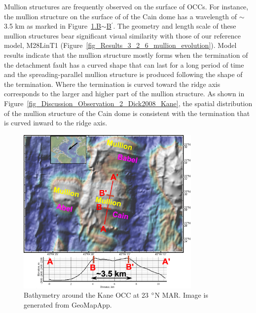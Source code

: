 Mullion structures are frequently observed on the surface of OCCs. For instance, the mullion structure on the surface of of the Cain dome has a wavelength of $\sim$3.5 km as marked in Figure~\hyperref[fig_Discussion_Observation_5_Mullion_Kane]{\ref{fig_Discussion_Observation_5_Mullion_Kane}.B$\sim$B$^\prime$}. The geometry and length scale of these mullion structures bear significant visual similarity with those of our reference model, M28LinT1 (Figure~\hyperref[fig_Results_3_2_6_mullion_evolution]{\ref{fig_Results_3_2_6_mullion_evolution}}). Model results indicate that the mullion structure mostly forms when the termination of the detachment fault has a curved shape that can last for a long period of time and the spreading-parallel mullion structure is produced following the shape of the termination. Where the termination is curved toward the ridge axis corresponds to the larger and higher part of the mullion structure. As shown in Figure~\hyperref[fig_Discussion_Observation_2_Dick2008_Kane]{\ref{fig_Discussion_Observation_2_Dick2008_Kane}}, the spatial distribution of the mullion structure of the Cain dome is consistent with the termination that is curved inward to the ridge axis.

\begin{figure}[h]
  \centering
    \includegraphics[width=0.8\textwidth]{./Figures/fig_Discussion_Observation_5_Mullion_Kane.eps}
  \caption[Bathymetry around the Kane OCC at 23 $\degree$N MAR.]{Bathymetry around the Kane OCC at 23 $\degree$N MAR. Image is generated from GeoMapApp.}
 \label{fig_Discussion_Observation_5_Mullion_Kane}
\end{figure}   

